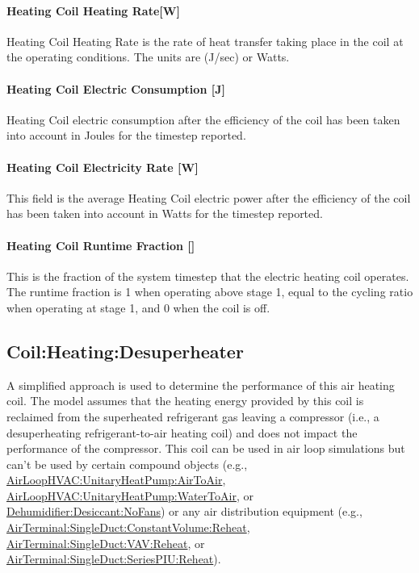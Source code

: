 \paragraph{Heating Coil Heating Rate{[}W{]}}\label{heating-coil-ratew}

Heating Coil Heating Rate is the rate of heat transfer taking place in the coil at the operating conditions. The units are (J/sec) or Watts.

\paragraph{Heating Coil Electric Consumption {[}J{]}}\label{heating-coil-electric-consumption-j}

Heating Coil electric consumption after the efficiency of the coil has been taken into account in Joules for the timestep reported.

\paragraph{Heating Coil Electricity Rate {[}W{]}}\label{heating-coil-electric-power-w-1}

This field is the average Heating Coil electric power after the efficiency of the coil has been taken into account in Watts for the timestep reported.

\paragraph{Heating Coil Runtime Fraction {[]}}\label{heating-coil-runtime-fraction-electric-multistage}

This is the fraction of the system timestep that the electric heating coil operates. The runtime fraction is 1 when operating above stage 1, equal to the cycling ratio when operating at stage 1, and 0 when the coil is off.

\subsection{Coil:Heating:Desuperheater}\label{coilheatingdesuperheater}

A simplified approach is used to determine the performance of this air heating coil. The model assumes that the heating energy provided by this coil is reclaimed from the superheated refrigerant gas leaving a compressor (i.e., a desuperheating refrigerant-to-air heating coil) and does not impact the performance of the compressor. This coil can be used in air loop simulations but can't be used by certain compound objects (e.g., \hyperref[airloophvacunitaryheatpumpairtoair]{AirLoopHVAC:UnitaryHeatPump:AirToAir}, \hyperref[airloophvacunitaryheatpumpwatertoair]{AirLoopHVAC:UnitaryHeatPump:WaterToAir}, or \hyperref[dehumidifierdesiccantnofans]{Dehumidifier:Desiccant:NoFans}) or any air distribution equipment (e.g., \hyperref[airterminalsingleductconstantvolumereheat]{AirTerminal:SingleDuct:ConstantVolume:Reheat}, \hyperref[airterminalsingleductvavreheat]{AirTerminal:SingleDuct:VAV:Reheat}, or \hyperref[airterminalsingleductseriespiureheat]{AirTerminal:SingleDuct:SeriesPIU:Reheat}).

